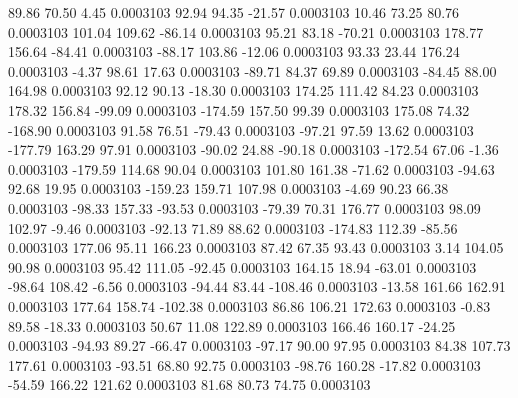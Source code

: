        89.86       70.50        4.45     0.0003103
       92.94       94.35      -21.57     0.0003103
       10.46       73.25       80.76     0.0003103
      101.04      109.62      -86.14     0.0003103
       95.21       83.18      -70.21     0.0003103
      178.77      156.64      -84.41     0.0003103
      -88.17      103.86      -12.06     0.0003103
       93.33       23.44      176.24     0.0003103
       -4.37       98.61       17.63     0.0003103
      -89.71       84.37       69.89     0.0003103
      -84.45       88.00      164.98     0.0003103
       92.12       90.13      -18.30     0.0003103
      174.25      111.42       84.23     0.0003103
      178.32      156.84      -99.09     0.0003103
     -174.59      157.50       99.39     0.0003103
      175.08       74.32     -168.90     0.0003103
       91.58       76.51      -79.43     0.0003103
      -97.21       97.59       13.62     0.0003103
     -177.79      163.29       97.91     0.0003103
      -90.02       24.88      -90.18     0.0003103
     -172.54       67.06       -1.36     0.0003103
     -179.59      114.68       90.04     0.0003103
      101.80      161.38      -71.62     0.0003103
      -94.63       92.68       19.95     0.0003103
     -159.23      159.71      107.98     0.0003103
       -4.69       90.23       66.38     0.0003103
      -98.33      157.33      -93.53     0.0003103
      -79.39       70.31      176.77     0.0003103
       98.09      102.97       -9.46     0.0003103
      -92.13       71.89       88.62     0.0003103
     -174.83      112.39      -85.56     0.0003103
      177.06       95.11      166.23     0.0003103
       87.42       67.35       93.43     0.0003103
        3.14      104.05       90.98     0.0003103
       95.42      111.05      -92.45     0.0003103
      164.15       18.94      -63.01     0.0003103
      -98.64      108.42       -6.56     0.0003103
      -94.44       83.44     -108.46     0.0003103
      -13.58      161.66      162.91     0.0003103
      177.64      158.74     -102.38     0.0003103
       86.86      106.21      172.63     0.0003103
       -0.83       89.58      -18.33     0.0003103
       50.67       11.08      122.89     0.0003103
      166.46      160.17      -24.25     0.0003103
      -94.93       89.27      -66.47     0.0003103
      -97.17       90.00       97.95     0.0003103
       84.38      107.73      177.61     0.0003103
      -93.51       68.80       92.75     0.0003103
      -98.76      160.28      -17.82     0.0003103
      -54.59      166.22      121.62     0.0003103
       81.68       80.73       74.75     0.0003103
